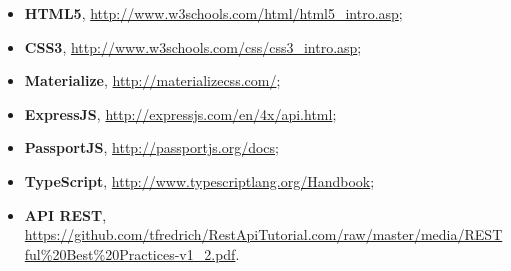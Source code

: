 \begin{itemize}
\item \textbf{HTML5}, \url{http://www.w3schools.com/html/html5\_intro.asp};
\item \textbf{CSS3}, \url{http://www.w3schools.com/css/css3\_intro.asp};
\item \textbf{Materialize}, \url{http://materializecss.com/};
\item \textbf{ExpressJS}, \url{http://expressjs.com/en/4x/api.html};
\item \textbf{PassportJS}, \url{http://passportjs.org/docs};
\item \textbf{TypeScript}, \url{http://www.typescriptlang.org/Handbook};
\item \textbf{API REST}, \url{https://github.com/tfredrich/RestApiTutorial.com/raw/master/media/RESTful\%20Best\%20Practices-v1\_2.pdf}.
\end{itemize}

